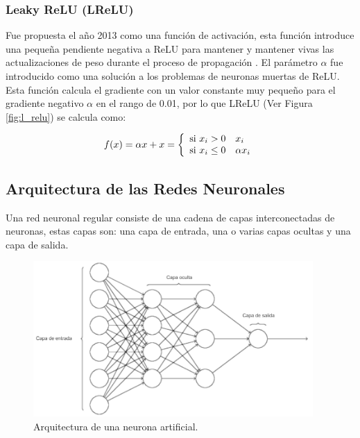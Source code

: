 \subsubsection{Leaky ReLU (LReLU)}

Fue propuesta el a\~{n}o 2013 como una funci\'{o}n de activaci\'{o}n, esta funci\'{o}n introduce una peque\~{n}a pendiente negativa a ReLU para mantener y mantener vivas las actualizaciones de peso durante el proceso de propagaci\'{o}n \cite{44}. El par\'{a}metro $\alpha$ fue introducido como una soluci\'{o}n a los problemas de neuronas muertas de ReLU. Esta funci\'{o}n calcula el gradiente con un valor constante muy peque\~{n}o para el gradiente negativo $\alpha$ en el rango de 0.01, por lo que LReLU (Ver Figura \ref{fig:l_relu}) se calcula como:

\begin{equation}
f(x) = \alpha x + x = \left\lbrace
\begin{array}{ll}
\textup{si } x_{i}>0 & x_{i}\\
\textup{si } x_{i} \leq 0 & \alpha x_{i}
\end{array}
\right.
\end{equation}

\subsection{Arquitectura de las Redes Neuronales}

Una red neuronal regular consiste de una cadena de capas interconectadas de neuronas, estas capas son: una capa de entrada, una o varias capas ocultas y una capa de salida. 

\begin{figure}[h!]
  \begin{center}	\includegraphics[width=0.95\textwidth]{imagenes/Cap4/arquitectura}
  \caption{Arquitectura de una neurona artificial.}
  \label{fig:arquitectura}
  \end{center}
\end{figure}

